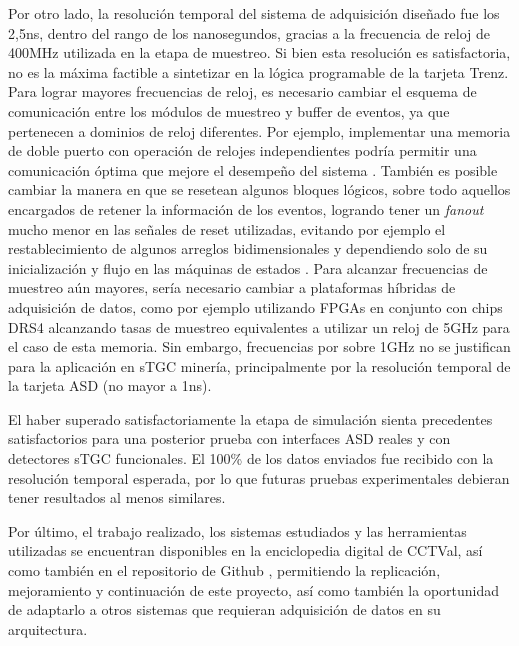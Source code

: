 Por otro lado, la resolución temporal del sistema de adquisición diseñado fue los 2,5ns, dentro del rango de los nanosegundos, gracias a la frecuencia de reloj de 400MHz utilizada en la etapa de muestreo. Si bien esta resolución es satisfactoria, no es la máxima factible a sintetizar en la lógica programable de la tarjeta Trenz. Para lograr mayores frecuencias de reloj, es necesario cambiar el esquema de comunicación entre los módulos de muestreo y buffer de eventos, ya que pertenecen a dominios de reloj diferentes. Por ejemplo, implementar una memoria de doble puerto con operación de relojes independientes podría permitir una comunicación óptima que mejore el desempeño del sistema . También es posible cambiar la manera en que se resetean algunos bloques lógicos, sobre todo aquellos encargados de retener la información de los eventos, logrando tener un \textit{fanout} mucho menor en las señales de reset utilizadas, evitando por ejemplo el restablecimiento de algunos arreglos bidimensionales y dependiendo solo de su inicialización y flujo en las máquinas de estados . Para alcanzar frecuencias de muestreo aún mayores, sería necesario cambiar a plataformas híbridas de adquisición de datos, como por ejemplo utilizando FPGAs en conjunto con chips DRS4\cite{RittDRS4Array} alcanzando tasas de muestreo equivalentes a utilizar un reloj de 5GHz para el caso de esta memoria. Sin embargo, frecuencias por sobre 1GHz no se justifican para la aplicación en sTGC minería, principalmente por la resolución temporal de la tarjeta ASD (no mayor a 1ns).

El haber superado satisfactoriamente la etapa de simulación sienta precedentes satisfactorios para una posterior prueba con interfaces ASD reales y con detectores sTGC funcionales. El 100\% de los datos enviados fue recibido con la resolución temporal esperada, por lo que futuras pruebas experimentales debieran tener resultados al menos similares.

Por último, el trabajo realizado, los sistemas estudiados y las herramientas utilizadas se encuentran disponibles en la enciclopedia digital de CCTVal, así como también en el repositorio de Github \cite{GonzalezMuonRepository} , permitiendo la replicación, mejoramiento y continuación de este proyecto, así como también la oportunidad de adaptarlo a otros sistemas que requieran adquisición de datos en su arquitectura.


